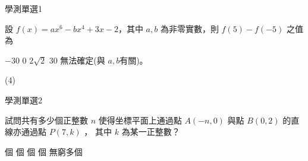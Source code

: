 \begin{QUESTIONS}
    \begin{QUESTION}
        \begin{ExamInfo}{96}{學測}{單選}{1}
        \end{ExamInfo}
        \begin{ExamAnsRateInfo}{71}{95}{81}{37}
        \end{ExamAnsRateInfo}
        \begin{QBODY}
            設 $f(x)=ax^6 -bx^4 +3x- 2$，其中 $a,b$ 為非零實數，則 $f(5)- f(-5)$ 之值為 
		\begin{QOPS} 
			\QOP $-30$        
			\QOP $0$        
			\QOP $2\sqrt{2}$ 
			\QOP $30$ 
			\QOP 無法確定(與 $a,b$有關)。
		\end{QOPS}
        \end{QBODY}
        \begin{QFROMS}
        \end{QFROMS}
        \begin{QTAGS}\end{QTAGS}
        \begin{QANS}
            (4)
        \end{QANS}
        \begin{QSOLLIST}
        \end{QSOLLIST}
        \begin{QEMPTYSPACE}
        \end{QEMPTYSPACE}
    \end{QUESTION}
    \begin{QUESTION}
        \begin{ExamInfo}{96}{學測}{單選}{2}
        \end{ExamInfo}
        \begin{ExamAnsRateInfo}{35}{58}{28}{19}
        \end{ExamAnsRateInfo}
        \begin{QBODY}
            試問共有多少個正整數 $n$ 使得坐標平面上通過點 $A(-n, 0)$ 與點 $B(0, 2)$ 的直線亦通過點 $P(7, k)$ ， 其中 $k$ 為某一正整數？
			\begin{QOPS} 
				\QOP 2 個 
				\QOP 4 個 
				\QOP 6 個 
				\QOP 8 個 
				\QOP 無窮多個
			\end{QOPS}
        \end{QBODY}
        \begin{QFROMS}
        \end{QFROMS}

\end{QUESTION}
\end{QUESTIONS}
